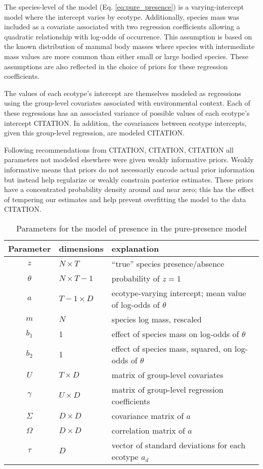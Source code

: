 \documentclass[12pt,letterpaper]{article}
\begin{document}
The species-level of the model (Eq. \ref{eq:pure_presence}) is a varying-intercept model where the intercept varies by ecotype. Additionally, species mass was included as a covariate associated with two regression coefficients allowing a quadratic relationship with log-odds of occurrence. This assumption is based on the known distribution of mammal body masses where species with intermediate mass values are more common than either small or large bodied species. These assumptions are also reflected in the choice of priors for these regression coefficients.

The values of each ecotype's intercept are themselves modeled as regressions using the group-level covariates associated with environmental context. Each of these regressions has an associated variance of possible values of each ecotype's intercept CITATION. In addition, the covariances between ecotype intercepts, given this group-level regression, are modeled CITATION.

Following recommendations from CITATION, CITATION, CITATION all parameters not modeled elsewhere were given weakly informative priors. Weakly informative means that priors do not necessarily encode actual prior information but instead help regularize or weakly constrain posterior estimates. These priors have a concentrated probability density around and near zero; this has the effect of tempering our estimates and help prevent overfitting the model to the data CITATION. 


\begin{table}
  \centering
  \caption{Parameters for the model of presence in the pure-presence model}
  \begin{tabular}{c l l}
    Parameter & dimensions & explanation \\
    \hline
    \(z\) & \(N \times T\) & ``true'' species presence/absence \\
    \(\theta\) & \(N \times T - 1\) & probability of \(z = 1\) \\
    \(a\) & \(T - 1 \times D\) & ecotype-varying intercept; mean value of log-odds of \(\theta\) \\
    \(m\) & \(N\) & species log mass, rescaled \\
    \(b_{1}\) & 1 & effect of species mass on log-odds of \(\theta\) \\
    \(b_{2}\) & 1 & effect of species mass, squared, on log-odds of \(\theta\) \\
    \(U\) & \(T \times D\) & matrix of group-level covariates \\
    \(\gamma\) & \(U \times D\) & matrix of group-level regression coefficients \\
    \(\Sigma\) & \(D \times D\) & covariance matrix of \(a\) \\
    \(\Omega\) & \(D \times D\) & correlation matrix of \(a\) \\
    \(\tau\) & \(D\) & vector of standard deviations for each ecotype \(a_{d}\) \\
  \end{tabular}
  \label{tab:pres_param}
\end{table}
\end{document}
